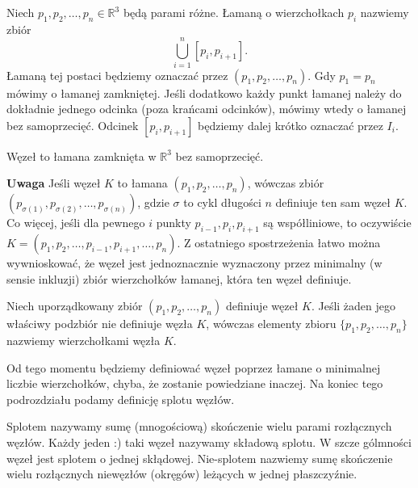 \begin{definicja}
 Niech $p_1, p_2, \ldots, p_n\in\mathbb{R}^3$ będą parami różne. Łamaną o wierzchołkach $p_i$ nazwiemy zbiór
 \begin{displaymath}
  \bigcup_{i=1}^n [p_i, p_{i+1}].
 \end{displaymath}
 Łamaną tej postaci będziemy oznaczać przez $(p_1, p_2, \ldots, p_n)$. Gdy $p_1 = p_n$ mówimy o łamanej zamkniętej.
 Jeśli dodatkowo każdy punkt łamanej należy do dokładnie jednego odcinka (poza krańcami odcinków), mówimy wtedy o łamanej bez samoprzecięć. Odcinek $[p_i, p_{i+1}]$ będziemy dalej krótko oznaczać przez $I_i$.
\end{definicja}
 
\begin{definicja}
 Węzeł to łamana zamknięta w $\mathbb{R}^3$ bez samoprzecięć.
\end{definicja}
 
\textbf{Uwaga} Jeśli węzeł $K$ to łamana $(p_1, p_2, \ldots, p_n)$, wówczas zbiór $(p_{\sigma(1)}, p_{\sigma(2)},\ldots, p_{\sigma(n)})$, gdzie $\sigma$ to cykl długości $n$
definiuje ten sam węzeł $K$.
Co więcej, jeśli dla pewnego $i$ punkty $p_{i-1}, p_i, p_{i+1}$ są współliniowe, to oczywiście $K = (p_1, p_2, \ldots, p_{i-1}, p_{i+1}, \ldots, p_n)$. Z ostatniego spostrzeżenia łatwo
można wywnioskować, że węzeł jest jednoznacznie wyznaczony przez minimalny (w sensie inkluzji) zbiór wierzchołków łamanej, która ten węzeł definiuje.
 
\begin{definicja}
 Niech uporządkowany zbiór $(p_1, p_2,\ldots, p_n)$ definiuje węzeł $K$. Jeśli żaden jego właściwy podzbiór nie definiuje węzła $K$, wówczas elementy zbioru $\lbrace p_1, p_2, \ldots, p_n\rbrace$
 nazwiemy wierzchołkami węzła $K$.
\end{definicja}
 
Od tego momentu będziemy definiować węzeł poprzez łamane o minimalnej liczbie wierzchołków, chyba, że zostanie powiedziane inaczej. Na koniec tego podrozdziału podamy definicję splotu węzłów.
 
\begin{definicja}
 Splotem nazywamy sumę (mnogościową) skończenie wielu parami rozłącznych węzłów. Każdy jeden :) taki węzeł nazywamy składową splotu. W szcze gólmności węzeł jest splotem o jednej skłądowej.
 Nie-splotem nazwiemy sumę skończenie wielu rozłącznych niewęzłów (okręgów) leżących w jednej płaszczyźnie.
\end{definicja}
 
